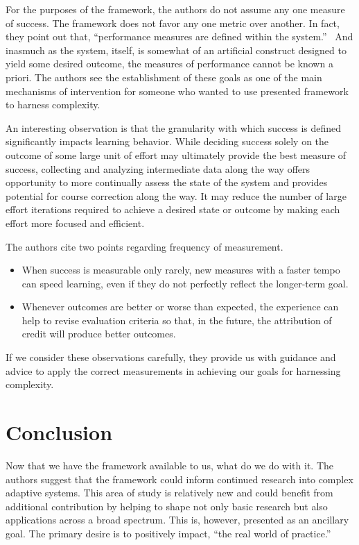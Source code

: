 \documentclass[jou,apacite]{apa6}
\begin{document}
For the purposes of the framework, the authors do not assume any one measure of success.  The framework does not favor any one metric over another.  In fact, they point out that, ``performance measures are defined within the system.''~\cite[page 121]{Axelrod}  And inasmuch as the system, itself, is somewhat of an artificial construct designed to yield some desired outcome, the measures of performance cannot be known a priori.  The authors see the establishment of these goals as one of the main mechanisms of intervention for someone who wanted to use presented framework to harness complexity.

An interesting observation is that the granularity with which success is defined significantly impacts learning behavior.  While deciding success solely on the outcome of some large unit of effort may ultimately provide the best measure of success, collecting and analyzing intermediate data along the way offers opportunity to more continually assess the state of the system and provides potential for course correction along the way.  It may reduce the number of large effort
iterations required to achieve a desired state or outcome by making each effort more focused and efficient.

The authors cite two points regarding frequency of measurement.
\begin{itemize}
  \item When success is measurable only rarely, new measures with a faster tempo can speed learning, even if they do not perfectly reflect the longer-term goal.
  \item Whenever outcomes are better or worse than expected, the experience can help to revise evaluation criteria so that, in the future, the attribution of credit will produce better outcomes.~\cite{Cohen}
\end{itemize}
If we consider these observations carefully, they provide us with guidance and advice to apply the correct measurements in achieving our goals for harnessing complexity.

\section{Conclusion}
Now that we have the framework available to us, what do we do with it.  The authors suggest that the framework could inform continued research into complex adaptive systems.  This area of study is relatively new and could benefit from additional contribution by helping to shape not only basic research but also applications across a broad spectrum.  This is, however, presented as an ancillary goal.  The primary desire is to positively impact, ``the real world of practice.''~\cite[page
159]{Axelrod}
\end{document}
